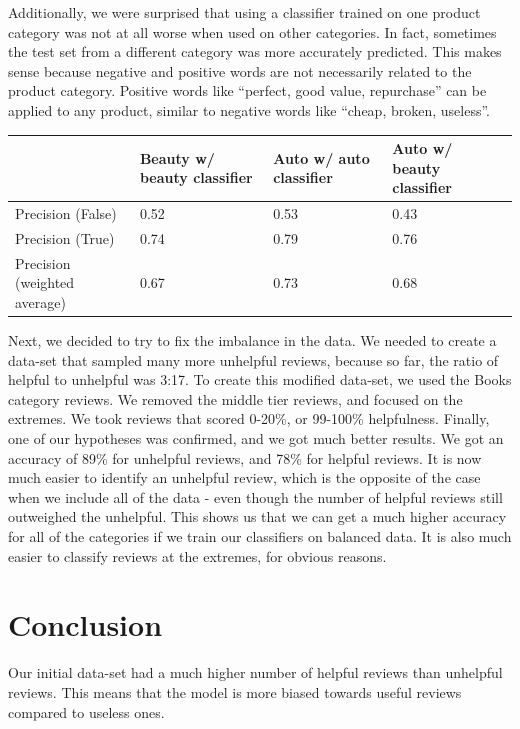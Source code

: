 \documentclass[11pt]{article}
\begin{document}
Additionally, we were surprised that using a classifier trained on one product category was not at all worse when used on other categories. In fact, sometimes the test set from a different category was more accurately predicted. This makes sense because negative and positive words are not necessarily related to the product category. Positive words like “perfect, good value, repurchase”  can be applied to any product, similar to negative words like “cheap, broken, useless”.

\vspace*{10px}
\begin{center}
\begin{tabular}{|p{1.4cm}|L{1.5cm}|L{1.5cm}|L{1.5cm}| } 
\hline
& Beauty w/ beauty classifier & Auto w/ auto classifier & Auto w/ beauty classifier \\
\hline
Precision (False) & 0.52 & 0.53 & 0.43 \\
\hline
Precision (True) & 0.74 & 0.79 & 0.76 \\
\hline
Precision (weighted average) & 0.67 & 0.73 & 0.68 \\ 
\hline
\end{tabular}
\end{center}
\vspace*{10px}

Next, we decided to try to fix the imbalance in the data. We needed to create a data-set that sampled many more unhelpful reviews, because so far, the ratio of helpful to unhelpful was 3:17. To create this modified data-set, we used the Books category reviews. We removed the middle tier reviews, and focused on the extremes. We took reviews that scored 0-20\%, or 99-100\% helpfulness. Finally, one of our hypotheses was confirmed, and we got much better results. We got an accuracy of 89\% for unhelpful reviews, and 78\% for helpful reviews. It is now much easier to identify an unhelpful review, which is the opposite of the case when we include all of the data - even though the number of helpful reviews still outweighed the unhelpful. This shows us that we can get a much higher accuracy for all of the categories if we train our classifiers on balanced data. It is also much easier to classify reviews at the extremes, for obvious reasons. 

\section{Conclusion}

Our initial data-set had a much higher number of helpful reviews than unhelpful reviews. This means that the model is more biased towards useful reviews compared to useless ones.
\end{document}
